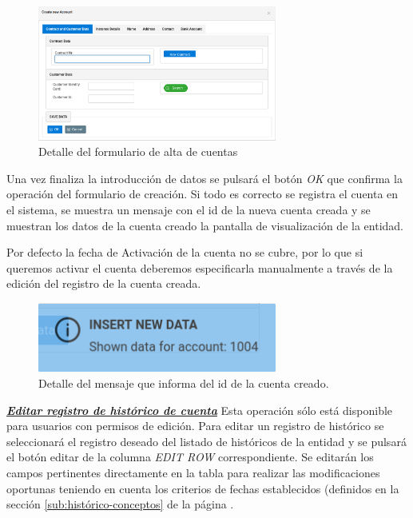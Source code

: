 \begin{figure}[H]
  \centering
  \includegraphics[width=0.70\textwidth]{imaxes/formulario-alta-cuenta.png}
  \caption{Detalle del formulario de alta de cuentas}
  \label{fig:formulario-alta-cuenta}
\end{figure}

Una vez finaliza la introducción de datos se pulsará el botón \emph{OK} que confirma la operación del formulario de creación. Si todo es correcto se registra el cuenta en el sistema, se muestra un mensaje con el id de la nueva cuenta creada y se muestran los datos de la cuenta creado la pantalla de visualización de la entidad.

Por defecto la fecha de Activación de la cuenta no se cubre, por lo que si queremos activar el cuenta deberemos especificarla manualmente a través de la edición del registro de la cuenta creada.


\begin{figure}[H]
  \centering
  \includegraphics[width=0.70\textwidth]{imaxes/mensaje-id-cuenta.png}
  \caption{Detalle del mensaje que informa del id de la cuenta creado.}
  \label{fig:mensaje-id-cuenta}
\end{figure}


\underline{\textsl{\textbf{Editar registro de histórico de cuenta}}}\newline
Esta operación sólo está disponible para usuarios con permisos de edición.
Para editar un registro de histórico se seleccionará el registro deseado del listado de históricos de la entidad y se pulsará el botón editar de la columna \textit{EDIT ROW} correspondiente. Se editarán los campos pertinentes directamente en la tabla para realizar las modificaciones oportunas teniendo en cuenta los criterios de fechas establecidos (definidos en la sección \ref{sub:histórico-conceptos} de la página \pageref{sub:histórico-conceptos}.

